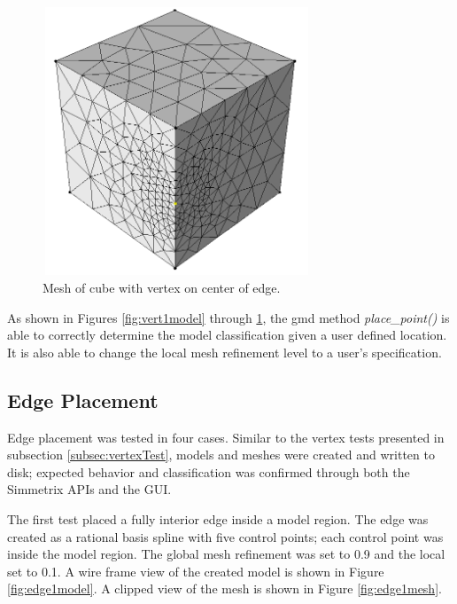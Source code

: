\documentclass[a4paper, 12pt]{article}
\begin{document}
\begin{figure}[H]
  \centering
  \includegraphics[width=8cm, height=8cm]{test5_sms}
  \caption{Mesh of cube with vertex on center of edge.}
  \label{fig:vert3mesh}
\end{figure}

As shown in Figures \ref{fig:vert1model} through \ref{fig:vert3mesh}, 
the gmd method \emph{place\_point()} is able to correctly determine 
the model classification given a user defined location. It is also 
able to change the local mesh refinement level to a user's specification. 

\subsection{Edge Placement} \label{subsec:edgeTest}
Edge placement was tested in four cases. Similar to the vertex tests 
presented in subsection \ref{subsec:vertexTest}, models and meshes
were created and written to disk; expected behavior and classification
was confirmed through both the Simmetrix APIs and the GUI.

The first test placed a fully interior edge inside a model region. 
The edge was created as a rational basis spline with five control points; 
each control point was inside the model region.
The global mesh refinement was set to 0.9 and the local set to 0.1. 
A wire frame view of the created model is
shown in Figure \ref{fig:edge1model}.
A clipped view of the mesh is shown in Figure \ref{fig:edge1mesh}.
\end{document}
